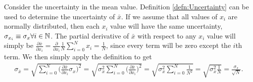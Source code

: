 Consider the uncertainty in the mean value. Definition \ref{defn:Uncertainty} can be used to determine the uncertainty of $\bar{x}$. If we assume that all values of $x_i$ are normally distributed, then each $x_i$ value will have the same uncertainty, $\sigma_{x_i}\equiv \sigma_x\forall i\in{\mathbb N}$. The partial derivative of $\bar{x}$ with respect to any $x_i$ value will simply be $\frac{\partial\bar{x}}{\partial x_i} = \frac{\partial}{\partial x_i} \frac{1}{N}\sum_{i=0}^{N}x_i = \frac{1}{N}$, since every term will be zero except the $i$th term. We then simply apply the definition to get
	\begin{align}
	\sigma_{\bar{x}} = \sqrt{\sum_{i=0}^{N}\bigg(\frac{\partial \bar{x}}{\partial x_i} \sigma_{x}\bigg)^2} =  \sqrt{\sigma_{x}^2\sum_{i=0}^{N}\bigg(\frac{\partial \bar{x}}{\partial x_i}\bigg)^2} = \sqrt{\sigma_{x}^2\sum_{i=0}^{N}\frac{1}{N^2}} = \sqrt{\sigma_{x}^2\frac{1}{N}} = \frac{\sigma_x}{\sqrt{N}}.
\end{align}

 